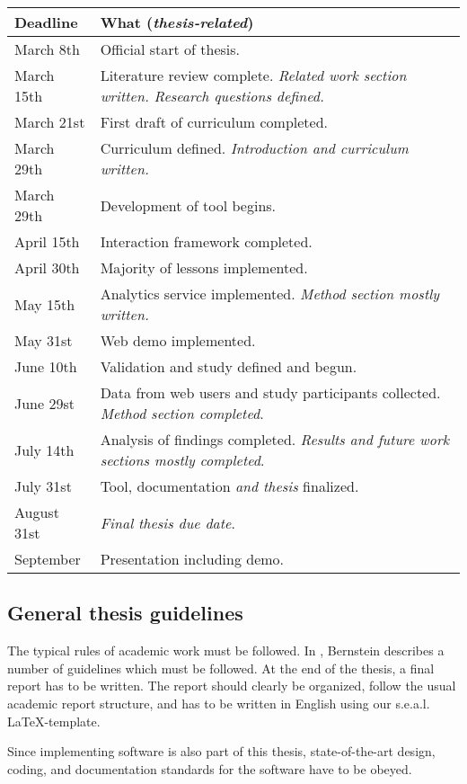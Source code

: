 \documentclass{task_description}
\begin{document}
\begin{tabular}{lp{10cm}}
Deadline & What (\emph{thesis-related}) \\
\hline\noalign{\smallskip}
March 8th   & Official start of thesis. \\
March 15th  & Literature review complete. \emph{Related work section written. Research questions defined.} \\
March 21st  & First draft of curriculum completed. \\
March 29th  & Curriculum defined. \emph{Introduction and curriculum written.} \\
March 29th  & Development of tool begins. \\
April 15th  & Interaction framework completed. \\
April 30th  & Majority of lessons implemented. \\
May 15th    & Analytics service implemented. \emph{Method section mostly written.} \\
May 31st    & Web demo implemented. \\
June 10th   & Validation and study defined and begun. \\
June 29st   & Data from web users and study participants collected. \emph{Method section completed}. \\
July 14th   & Analysis of findings completed. \emph{Results and future work sections mostly completed}. \\
July 31st   & Tool, documentation \emph{and thesis} finalized. \\
August 31st & \emph{Final thesis due date}. \\
September   & Presentation including demo. \\
\end{tabular}

\subsection*{General thesis guidelines}

The typical rules of academic work must be followed. In
\cite{Bernstein2005-daguide}, Bernstein describes a number of guidelines which
must be followed. At the end of the thesis, a final report has to be
written. The report should clearly be organized, follow the usual academic
report structure, and has to be written in English using our
s.e.a.l. \LaTeX-template.

Since implementing software is also part of this thesis, state-of-the-art
design, coding, and documentation standards for the software have to be obeyed.
\end{document}
